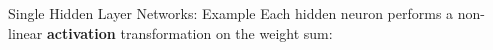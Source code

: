 \documentclass[11pt,compress,t,notes=noshow, xcolor=table]{beamer}
\begin{document}

\begin{frame} {Single Hidden Layer Networks: Example}
Each hidden neuron performs a non-linear \textbf{activation} transformation on the weight sum:
\begin{figure}
\centering
{}
\end{figure}
\end{frame}
\end{document}

